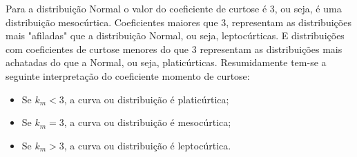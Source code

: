 \documentclass[11pt,fleqn]{book} %
\begin{document}
\vspace{0,3cm}

Para a distribuição Normal o valor do coeficiente de curtose é 3, ou seja, é uma distribuição mesocúrtica. Coeficientes maiores que 3, representam as distribuições mais "afiladas" que a distribuição Normal, ou seja, leptocúrticas. E distribuições com coeficientes de curtose menores do que 3 representam as distribuições mais achatadas do que a Normal, ou seja, platicúrticas. Resumidamente tem-se a seguinte interpretação do coeficiente momento de curtose: \\

\begin{itemize}
\item Se $k_m<3$, a curva ou distribuição é platicúrtica;
\item Se $k_m=3$, a curva ou distribuição é mesocúrtica;
\item Se $k_m>3$, a curva ou distribuição é leptocúrtica.
\end{itemize}

\vspace{0,5cm}
\end{document}
